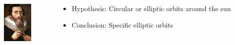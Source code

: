 \documentclass{beamer}
\begin{document}
\begin{frame}
\begin{columns}
\begin{column}{0.5\textwidth}
    \end{column}
  \end{columns}
  \begin{columns}
    \begin{column}{0.1\textwidth}
      \includegraphics[width=4em]{figures/Johannes-Kepler.jpg}
    \end{column}
    \begin{column}{0.9\textwidth}
      \begin{itemize}
      \item Hypothesis: Circular \alert{or} elliptic orbits around the \alert{sun}
      \item Conclusion: Specific \alert{elliptic} orbits
      \end{itemize}
    \end{column}
  \end{columns}
\end{frame}
\end{document}
